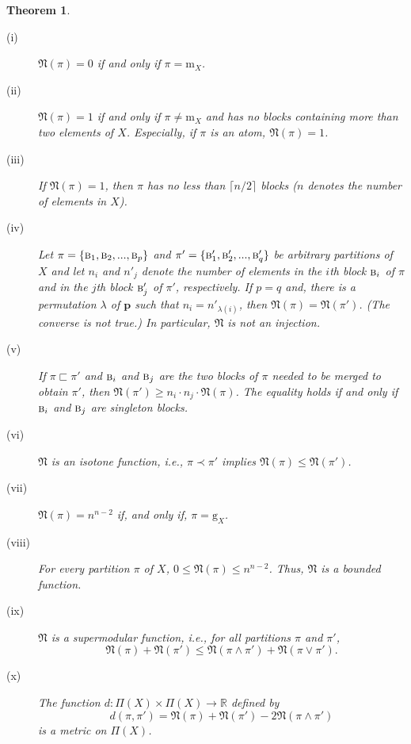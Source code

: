 \documentclass[12pt]{extarticle}
\newtheorem{Theorem}{Theorem}
\begin{document}
	\begin{Theorem}
		\begin{description}
			\item[(\textrm{i})]  $\mathfrak{N}(\pi) = 0$ if and only if $\pi=\textrm{m}_X$. 
			\item[(\textrm{ii})] $\mathfrak{N}(\pi) = 1$ if and only if $\pi\neq \textrm{m}_X$ and has no blocks containing more than two elements of $X$. Especially, if $\pi$ is an atom, $\mathfrak{N}(\pi) = 1$.
			\item[(\textrm{iii})] If $\mathfrak{N}(\pi) = 1$, then $\pi$ has no less than $\lceil n/2\rceil$ blocks ($n$ denotes the number of elements in $X$).
			\item[(\textrm{iv})] Let $\pi = \{\textsc{b}_1, \textsc{b}_2, ..., \textsc{b}_p\}$ and $\pi' = \{\textsc{b}'_1, \textsc{b}'_2, ..., \textsc{b}'_q\}$ be arbitrary partitions of $X$ and let $n_i$ and $n'_j$ denote the number of elements in the $i$th block $\textsc{b}_i$ of $\pi$ and in the $j$th block $\textsc{b}'_j$ of $\pi'$, respectively. If $p = q$ and, there is a permutation $\lambda$ of $\mathbf{p}$ such that $n_i = n'_{\lambda(i)}$, then $\mathfrak{N}(\pi) = \mathfrak{N}(\pi')$. (The converse is not true.) In particular, $\mathfrak{N}$ is not an injection. 
			\item[(\textrm{v})] 
			If $\pi \sqsubset \pi'$ and $\textsc{b}_i$ and $\textsc{b}_j$ are the two blocks of $\pi$ needed to be merged to obtain $\pi'$, then $\mathfrak{N}(\pi') \geq n_i\cdot n_j\cdot \mathfrak{N}(\pi)$. The equality holds if and only if $\textsc{b}_i$ and $\textsc{b}_j$ are singleton blocks.
			\item[(\textrm{vi})] $\mathfrak{N}$ is an isotone function, i.e., $\pi \prec   \pi'$ implies $\mathfrak{N}(\pi) \leq \mathfrak{N}(\pi')$.
			\item[(\textrm{vii})] $\mathfrak{N}(\pi)=n^{n-2}$ if, and only if, $\pi=\textrm{g}_X$.
			\item[(\textrm{viii})] For every partition $\pi$ of $X$, $0\leq\mathfrak{N}(\pi)\leq n^{n-2}$. Thus, $\mathfrak{N}$ is a bounded function.
			\item[(\textrm{ix})] $\mathfrak{N}$ is a supermodular function, i.e., for all partitions $\pi$ and $\pi'$,
			\begin{equation}
			\mathfrak{N}(\pi) +\mathfrak{N}(\pi') \leq \mathfrak{N}(\pi\wedge \pi') +\mathfrak{N}(\pi\vee\pi').
			\end{equation}
			
			\item[(\textrm{x})]The function $d:\Pi(X)\times\Pi(X)\rightarrow \mathbb{R}$
			defined by
			\begin{equation}
			d(\pi,\pi')= \mathfrak{N}(\pi) +\mathfrak{N}(\pi') -2\mathfrak{N}(\pi\wedge \pi')
			\end{equation}
			is a metric on $\Pi(X)$.
		\end{description}
	\end{Theorem}
	
\end{document}
